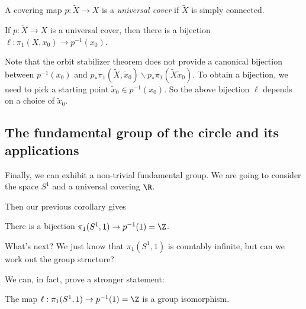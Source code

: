 \documentclass[a4paper]{article}
\begin{document}
\begin{defi}
  A covering map $p: \tilde{X} \to X$ is a \emph{universal cover} if $\tilde{X}$ is simply connected.
\end{defi}

\begin{cor}
  If $p: \tilde{X} \to X$ is a universal cover, then there is a bijection $\ell: \pi_1(X, x_0) \to p^{-1}(x_0)$.
\end{cor}
Note that the orbit stabilizer theorem does not provide a canonical bijection between $p^{-1}(x_0)$ and $p_* \pi_1(\tilde{X}, \tilde{x}_0)\backslash p_* \pi_1(\tilde{X}\tilde{x}_0)$. To obtain a bijection, we need to pick a starting point $\tilde{x}_0 \in p^{-1}(x_0)$. So the above bijection $\ell$ depends on a choice of $\tilde{x}_0$.

\subsection{The fundamental group of the circle and its applications}
Finally, we can exhibit a non-trivial fundamental group. We are going to consider the space $S^1$ and a universal covering $\R$.
\begin{center}
\end{center}
Then our previous corollary gives
\begin{cor}
  There is a bijection $\pi_1(S^1, 1) \to p^{-1}(1) = \Z$.
\end{cor}
What's next? We just know that $\pi_1(S^1, 1)$ is countably infinite, but can we work out the group structure?

We can, in fact, prove a stronger statement:
\begin{thm}[]
  The map $\ell: \pi_1(S^1, 1) \to p^{-1}(1) = \Z$ is a group isomorphism.
\end{thm}
\end{document}
